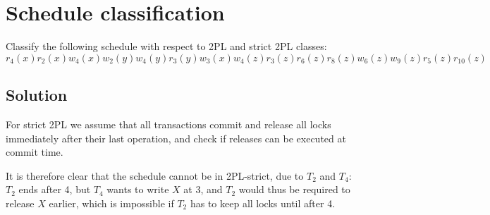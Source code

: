 \documentclass[12pt, a4paper]{report}
\newtheorem[style=M,bodystyle=\normalfont]{theorem}{Theorem}
\newtheorem[style=M,bodystyle=\normalfont]{corollary}{Corollary}
\newtheorem[style=M,bodystyle=\normalfont]{lemma}{Lemma}
\newtheorem[style=M,bodystyle=\normalfont]{definition}{Definition}
\begin{document}
    \newpage

    \section{Schedule classification}
        Classify the following schedule with respect to 2PL and strict 2PL classes: 
        \[r_4(x) r_2(x) w_4(x) w_2(y) w_4(y) r_3(y) w_3(x) w_4(z) r_3(z) r_6(z) r_8(z) w_6(z) w_9(z) r_5(z) r_10(z)\]
    \subsection*{Solution}
        For strict 2PL we assume that all transactions commit and release all locks immediately after their last operation, and check if releases can be executed at commit time.
        \begin{table}[H]
            \centering
        \end{table}
        It is therefore clear that the schedule cannot be in 2PL-strict, due to $T_2$ and $T_4$: $T_2$ ends after 4, but $T_4$ wants to write $X$ at 3, and $T_2$ would thus be 
        required to release $X$ earlier, which is impossible if $T_2$ has to keep all locks until after 4.
\end{document}

